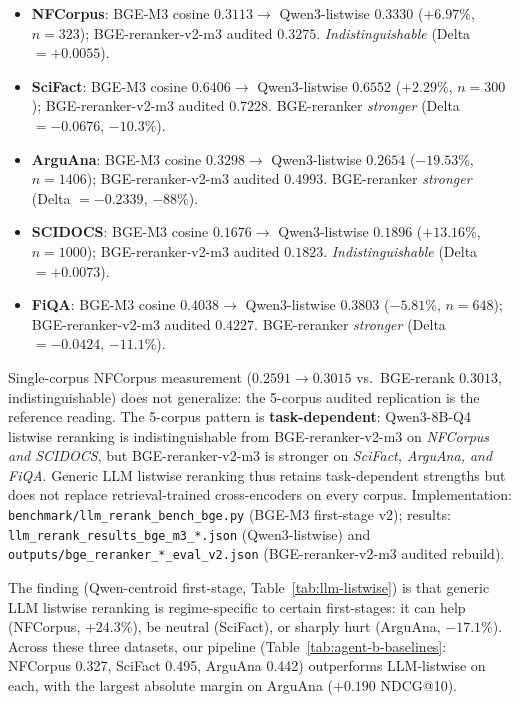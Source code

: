 \documentclass[review,1p]{elsarticle}
\begin{document}
\begin{itemize}
\item \textbf{NFCorpus}: BGE-M3 cosine $0.3113 \to$ Qwen3-listwise $\mathbf{0.3330}$ ($+6.97\%$, $n=323$); BGE-reranker-v2-m3 audited $0.3275$. \emph{Indistinguishable} (Delta $=+0.0055$).
\item \textbf{SciFact}: BGE-M3 cosine $0.6406 \to$ Qwen3-listwise $\mathbf{0.6552}$ ($+2.29\%$, $n=300$); BGE-reranker-v2-m3 audited $\mathbf{0.7228}$. BGE-reranker \emph{stronger} (Delta $=-0.0676$, $-10.3\%$).
\item \textbf{ArguAna}: BGE-M3 cosine $0.3298 \to$ Qwen3-listwise $0.2654$ ($-19.53\%$, $n=1406$); BGE-reranker-v2-m3 audited $\mathbf{0.4993}$. BGE-reranker \emph{stronger} (Delta $=-0.2339$, $-88\%$).
\item \textbf{SCIDOCS}: BGE-M3 cosine $0.1676 \to$ Qwen3-listwise $\mathbf{0.1896}$ ($+13.16\%$, $n=1000$); BGE-reranker-v2-m3 audited $0.1823$. \emph{Indistinguishable} (Delta $=+0.0073$).
\item \textbf{FiQA}: BGE-M3 cosine $0.4038 \to$ Qwen3-listwise $0.3803$ ($-5.81\%$, $n=648$); BGE-reranker-v2-m3 audited $\mathbf{0.4227}$. BGE-reranker \emph{stronger} (Delta $=-0.0424$, $-11.1\%$).
\end{itemize}

Single-corpus NFCorpus measurement ($0.2591 \to 0.3015$ vs.\ BGE-rerank $0.3013$, indistinguishable) does not generalize: the 5-corpus audited replication is the reference reading. The 5-corpus pattern is \textbf{task-dependent}: Qwen3-8B-Q4 listwise reranking is indistinguishable from BGE-reranker-v2-m3 on \emph{NFCorpus and SCIDOCS}, but BGE-reranker-v2-m3 is stronger on \emph{SciFact, ArguAna, and FiQA}. Generic LLM listwise reranking thus retains task-dependent strengths but does not replace retrieval-trained cross-encoders on every corpus. Implementation: \texttt{benchmark/llm\_rerank\_bench\_bge.py} (BGE-M3 first-stage v2); results: \texttt{llm\_rerank\_results\_bge\_m3\_*.json} (Qwen3-listwise) and \texttt{outputs/bge\_reranker\_*\_eval\_v2.json} (BGE-reranker-v2-m3 audited rebuild).

The finding (Qwen-centroid first-stage, Table~\ref{tab:llm-listwise}) is that generic LLM listwise reranking is regime-specific to certain first-stages: it can help (NFCorpus, $+24.3\%$), be neutral (SciFact), or sharply hurt (ArguAna, $-17.1\%$). Across these three datasets, our pipeline (Table~\ref{tab:agent-b-baselines}: NFCorpus 0.327, SciFact 0.495, ArguAna 0.442) outperforms LLM-listwise on each, with the largest absolute margin on ArguAna ($+0.190$ NDCG@10).
\end{document}
